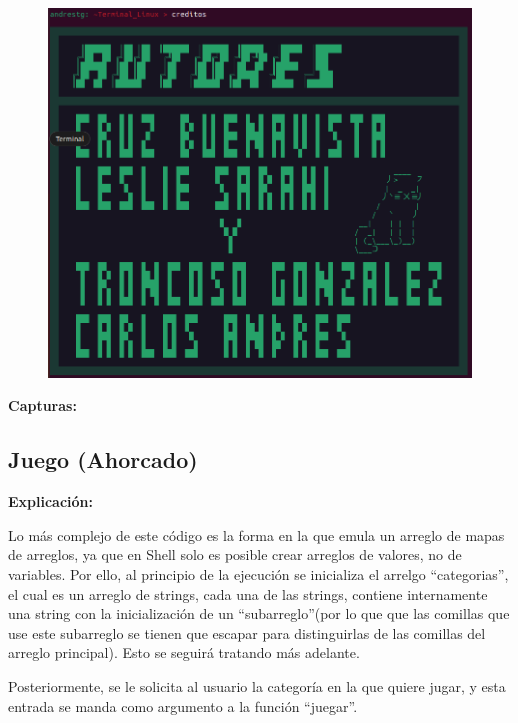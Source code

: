 \documentclass[letter,12pt]{article} %
\begin{document}
\begin{figure}[H]
	\centering
	\includegraphics[scale=0.6]{imagenes/creditos.png}
\end{figure}

\textbf{Capturas:} \par

\subsection{Juego (Ahorcado)}
\textbf{Explicación:} \par
Lo más complejo de este código es la forma en la que emula un arreglo de mapas de arreglos, ya que en Shell solo es posible crear arreglos de valores, no de variables. Por ello, al principio de la ejecución se inicializa el arrelgo \textquotedblleft categorias\textquotedblright, el cual es un arreglo de strings, cada una de las strings, contiene internamente una string con la inicialización de un \textquotedblleft subarreglo\textquotedblright (por lo que que las comillas que use este subarreglo se tienen que escapar para distinguirlas de las comillas del arreglo principal). Esto se seguirá tratando más adelante.\\
\vspace{\baselineskip}

Posteriormente, se le solicita al usuario la categoría en la que quiere jugar, y esta entrada se manda como argumento a la función \textquotedblleft juegar\textquotedblright.\\
\vspace{\baselineskip}
\end{document}
